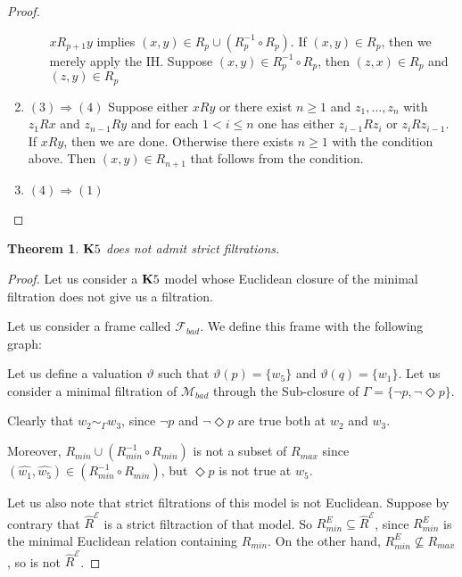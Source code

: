 \documentclass[a4paper]{article}
\theoremstyle{defin}
\theoremstyle{theorem}
\newtheorem{theorem}{Theorem}
\theoremstyle{prop}
\theoremstyle{lemma}
\theoremstyle{fact}
\theoremstyle{ex}
\theoremstyle{col}
\theoremstyle{claim}
\begin{document}
\begin{proof}
\begin{enumerate}
\begin{enumerate}
    $x R_{p + 1} y$ implies $(x, y) \in R_{p} \cup (R^{-1}_p \circ R_p)$. If $(x, y) \in R_{p}$, then we merely apply the IH.
    Suppose $(x, y) \in R^{-1}_p \circ R_p$, then $(z, x) \in R_p$ and $(z, y) \in R_p$
  \end{enumerate}
  \item $(3) \Rightarrow (4)$
  Suppose either $x R y$ or there exist $n \geq 1$ and $z_1, \dots, z_n$ with $z_1 R x$ and $z_{n - 1} R y$ and for each $1 < i \leq n$ one has either $z_{i - 1} R z_i$ or $z_i R z_{i - 1}$.
  If $x R y$, then we are done. Otherwise there exists $n \geq 1$ with the condition above. Then $(x, y) \in R_{n + 1}$ that follows from the condition.
  \item $(4) \Rightarrow (1)$
\end{enumerate}
\end{proof}

\begin{theorem}\label{sad}
  ${\bf K}5$ does not admit strict filtrations.
\end{theorem}

\begin{proof}
  Let us consider a ${\bf K}5$ model whose Euclidean closure of the minimal filtration does not give us a filtration.

  Let us consider a frame called $\mathcal{F}_{bad}$. We define this frame with the following graph:

\vspace{\baselineskip}


Let us define a valuation $\vartheta$ such that $\vartheta(p) = \{ w_5\}$ and $\vartheta(q) = \{ w_1\}$. Let us consider a minimal filtration of $\mathcal{M}_{bad}$ through the Sub-closure of $\Gamma = \{ \neg p, \neg \Diamond p\}$.

Clearly that $w_2 \sim_{\Gamma} w_3$, since $\neg p$ and $\neg \Diamond p$ are true both at $w_2$ and $w_3$.

Moreover, $R_{min} \cup (R_{min}^{-1} \circ R_{min})$ is not a subset of $R_{max}$ since $(\hat{w_1}, \hat{w_5}) \in (R_{min}^{-1} \circ R_{min})$, but $\Diamond p$ is not true at $w_5$.

Let us also note that strict filtrations of this model is not Euclidean.
Suppose by contrary that $\widehat{R}^{\mathcal{E}}$ is a strict filtraction of that model. So $R_{min}^E \subseteq \widehat{R}^{\mathcal{E}}$, since $R_{min}^E$ is the minimal Euclidean relation containing $R_{min}$. On the other hand, $R_{min}^E \not\subseteq R_{max}$, so is not $\widehat{R}^{\mathcal{E}}$.
\end{proof}
\end{document}
